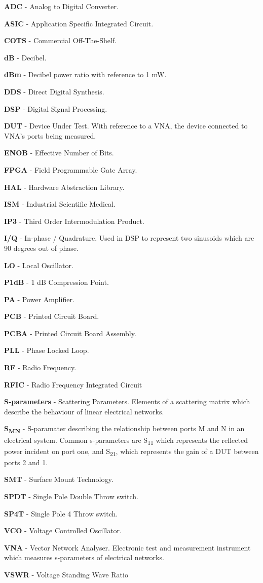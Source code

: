 \textbf{ADC} - Analog to Digital Converter.

\textbf{ASIC} - Application Specific Integrated Circuit.

\textbf{COTS} - Commercial Off-The-Shelf.

\textbf{dB} - Decibel.

\textbf{dBm} - Decibel power ratio with reference to 1 mW.

\textbf{DDS} - Direct Digital Synthesis. 

\textbf{DSP} - Digital Signal Processing.

\textbf{DUT} - Device Under Test. With reference to a VNA, the device connected to VNA's ports being measured. 

\textbf{ENOB} - Effective Number of Bits.

\textbf{FPGA} - Field Programmable Gate Array.

\textbf{HAL} - Hardware Abstraction Library.

\textbf{ISM} - Industrial Scientific Medical.

\textbf{IP3} - Third Order Intermodulation Product.

\textbf{I/Q} - In-phase / Quadrature. Used in DSP to represent two sinusoids which are 90 degrees out of phase. 

\textbf{LO} - Local Oscillator. 

\textbf{P1dB} - 1 dB Compression Point. 

\textbf{PA} - Power Amplifier.

\textbf{PCB} - Printed Circuit Board. 

\textbf{PCBA} - Printed Circuit Board Assembly.

\textbf{PLL} - Phase Locked Loop.

\textbf{RF} - Radio Frequency.

\textbf{RFIC} - Radio Frequency Integrated Circuit

\textbf{S-parameters} - Scattering Parameters. Elements of a scattering matrix which describe the behaviour of linear electrical networks. 

\textbf{S\textsubscript{MN}} - S-paramater describing the relationship between ports M and N in an electrical system. Common s-parameters are S\textsubscript{11} which represents the reflected power incident on port one, and S\textsubscript{21}, which represents the gain of a DUT between ports 2 and 1. 

\textbf{SMT} - Surface Mount Technology.

\textbf{SPDT} - Single Pole Double Throw switch. 

\textbf{SP4T} - Single Pole 4 Throw switch. 

\textbf{VCO} - Voltage Controlled Oscillator.

\textbf{VNA} - Vector Network Analyser. Electronic test and measurement instrument which measures s-parameters of electrical networks. 

\textbf{VSWR} - Voltage Standing Wave Ratio
